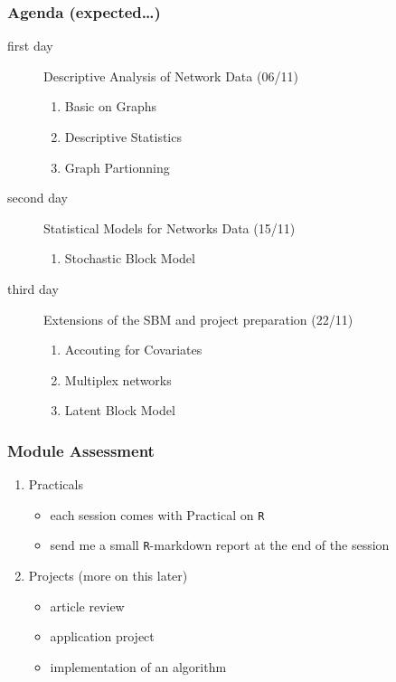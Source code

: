 \documentclass{beamer}\usepackage[]{graphicx}\usepackage[]{color}
\begin{document}
\begin{frame} 
  \frametitle{Agenda (expected\dots)}

  \begin{description}
  \item[first day] Descriptive Analysis of Network Data (06/11)
    \begin{enumerate}
    \item \alert{Basic on Graphs} 
    \item \alert{Descriptive Statistics} 
    \item \alert{Graph Partionning} 
    \end{enumerate}

  \bigskip

  \item[second day] Statistical Models for Networks Data (15/11)
    \begin{enumerate}
    \item \alert{Stochastic Block Model} 
    \end{enumerate}

  \bigskip

  \item[third day] Extensions of the SBM and project preparation (22/11)
    \begin{enumerate}
    \item \alert{Accouting for Covariates} 
    \item \alert{Multiplex networks} 
    \item \alert{Latent Block Model} 
    \end{enumerate}

  \end{description}
    
  \end{frame}

  \begin{frame}
    \frametitle{Module Assessment}

\begin{enumerate}
\item \alert{Practicals}

\begin{itemize}
\item each session comes with Practical on \texttt{R}
\item send me a small \texttt{R}-markdown report \alert{at the end of the session}
\end{itemize}
\bigskip

\item \alert{Projects} (more on this later)
  
\begin{itemize}
\item article review
\item application project
\item implementation of an algorithm
\end{itemize}

\end{enumerate}
       
\end{frame}
  
\end{document}
